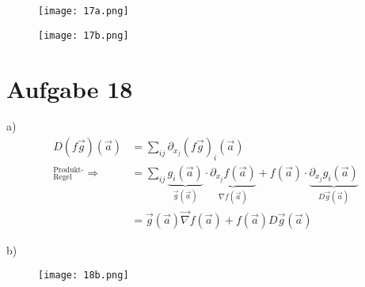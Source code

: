 \documentclass[10pt]{article}
\begin{document}
\thispagestyle{fancy}

\begin{figure}[H]
	\centering
	\texttt{[image: 17a.png]}
\end{figure}

\newpage
\setlength{\headheight}{0cm}
\begin{figure}[H]
	\centering
	\texttt{[image: 17b.png]}
\end{figure}

\newpage
\section*{Aufgabe 18}
a) 
\begin{align*}
	D \left(f \vec g\right) (\vec a)
	&= \sum_{i j} \partial_{x_j} \left(f \vec g\right)_i (\vec a) \\
	^\text{Produkt-}_\text{Regel} \Rightarrow
	&= \sum_{i j} \underbrace{g_i (\vec a)}_{\vec g(\vec a)} 
	\cdot \underbrace{\partial_{x_j} f(\vec a)}_{\nabla f(\vec a)}
	+ f(\vec a) 
	\cdot \underbrace{\partial_{x_j} g_i(\vec a)}_{D\vec g(\vec a)}
	\\
	&= \vec g(\vec a) \vec\nabla f(\vec a) + f(\vec a) D\vec g(\vec a)
\end{align*}

b)
\begin{figure}[H]
	\centering
	\texttt{[image: 18b.png]}
\end{figure}
\end{document}
